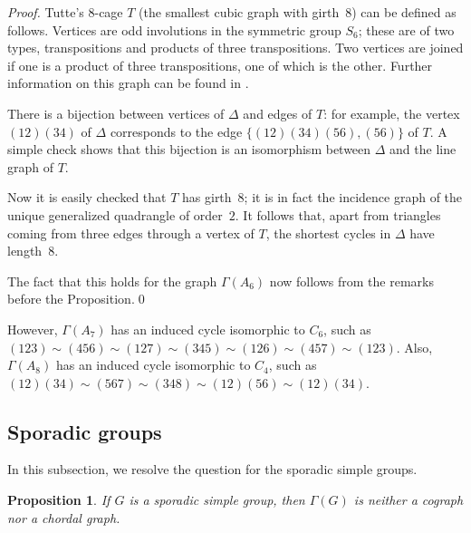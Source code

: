 \documentclass{elsarticle}
\newtheorem{prop}[theorem]{Proposition}
\begin{document}
\begin{proof} Tutte's $8$-cage $T$ (the smallest cubic graph with girth~$8$)
can be defined as follows. Vertices are odd involutions in the symmetric group
$S_6$; these are of two types, transpositions and products of three
transpositions. Two vertices are joined if one is a product of three
transpositions, one of which is the other. Further information on this graph
can be found in \cite[p.~209]{BCN}.

There is a bijection between vertices of $\Delta$ and edges of $T$: for
example, the vertex $(12)(34)$ of $\Delta$ corresponds to the edge
$\{(12)(34)(56), (56)\}$ of $T$. A simple check shows that this bijection is
an isomorphism between $\Delta$ and the line graph of $T$.

Now it is easily checked that $T$ has girth~$8$; it is in fact the incidence
graph of the unique generalized quadrangle of order~$2$. It follows that, apart
from triangles coming from three edges through a vertex of $T$, the shortest
cycles in $\Delta$ have length~$8$.

The fact that this holds for the graph $\Gamma(A_6)$ now follows from the
remarks before the Proposition.\qed
\end{proof}

\begin{remark}
However, $\Gamma(A_7)$ has an induced cycle isomorphic to $C_{6}$, such as $(123)\sim(456)\sim(127)\sim(345)\sim(126)\sim(457)\sim(123)$. Also, $\Gamma(A_8)$ has an induced cycle isomorphic to $C_{4}$, such as $(12)(34)\sim(567)\sim(348)\sim(12)(56)\sim(12)(34)$.
\end{remark}

\subsection{Sporadic groups}

In this subsection, we resolve the question for the sporadic simple groups.

\begin{prop}
If $G$ is a sporadic simple group, then $\Gamma(G)$ is neither a cograph nor a chordal graph.
\end{prop}
\end{document}
